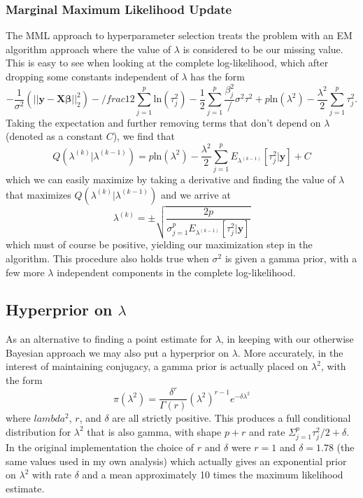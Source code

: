 \documentclass{uwstat572}
\begin{document}
\subsubsection{Marginal Maximum Likelihood Update}
The MML approach to hyperparameter selection treats the problem with an EM algorithm approach where the value of $\lambda$ is considered to be our missing value. This is easy to see when looking at the complete log-likelihood, which after dropping some constants independent of $\lambda$ has the form \[
-\frac{1}{\sigma^2}(||\mathbf{y}-\mathbf{X}\boldsymbol\beta||^2_2)-/frac{1}{2}\sum^p_{j=1}\text{ln}(\tau_j^2)-\frac{1}{2}\sum^p_{j=1}\frac{\beta^2_j}/\sigma^2\tau^2+p\text{ln}(\lambda^2)-\frac{\lambda^2}{2}\sum^p_{j=1}\tau^2_j.
\] Taking the expectation and further removing terms that don't depend on $\lambda$ (denoted as a constant $C$), we find that \[
Q(\lambda^{(k)}|\lambda^{(k-1)})=p\text{ln}(\lambda^2)-\frac{\lambda^2}{2}\sum^p_{j=1}E_{\lambda^{(k-1)}}[\tau^2_j|\mathbf{y}]+C
\] which we can easily maximize by taking a derivative and finding the value of $\lambda$ that maximizes $Q(\lambda^{(k)}|\lambda^{(k-1)})$ and we arrive at 
\[
\lambda^{(k)}=\pm\sqrt{\frac{2p}{\sigma^p_{j=1}E_{\lambda^{(k-1)}}[\tau^2_j|\mathbf{y}]}}
\] which must of course be positive, yielding our maximization step in the algorithm. This procedure also holds true when $\sigma^2$ is given a gamma prior, with a few more $\lambda$ independent components in the complete log-likelihood.

\subsection{Hyperprior on $\lambda$}
As an alternative to finding a point estimate for $\lambda$, in keeping with our otherwise Bayesian approach we may also put a hyperprior on $\lambda$. More accurately, in the interest of maintaining conjugacy, a gamma prior is actually placed on $\lambda^2$, with the form\[
\pi(\lambda^2)=\frac{\delta^r}{\Gamma(r)}(\lambda^2)^{r-1}e^{-\delta\lambda^2}
\] where $lambda^2$, $r$, and $\delta$ are all strictly positive. This produces a full conditional distribution for $\lambda^2$ that is also gamma, with shape $p+r$ and rate $\Sigma^p_{j=1}\tau^2_j/2+\delta$. In the original implementation the choice of $r$ and $\delta$ were $r=1$ and $\delta=1.78$ (the same values used in my own analysis) which actually gives an exponential prior on $\lambda^2$ with rate $\delta$ and a mean approximately 10 times the maximum likelihood estimate.
\end{document}

